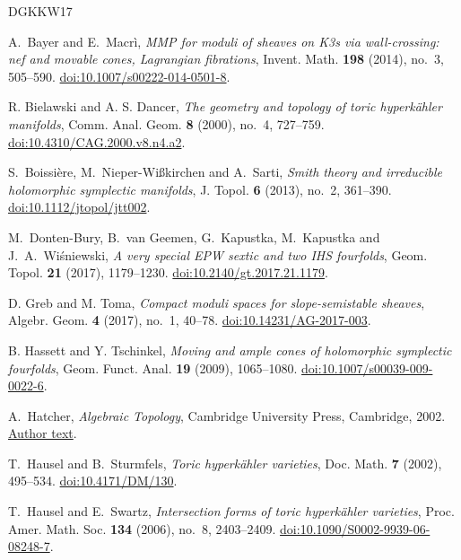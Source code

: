 \begin{thebibliography}{DGKKW17}

A.~Bayer and E.~Macr\`i,
\emph{MMP for moduli of sheaves on K3s via wall-crossing: nef and
movable cones, Lagrangian fibrations},
Invent. Math. \textbf{198} (2014), no.~3, 505--590.
\href{https://doi.org/10.1007/s00222-014-0501-8}{doi:10.1007/s00222-014-0501-8}.

R. Bielawski and A. S. Dancer,
\emph{The geometry and topology of toric hyperk\"ahler manifolds},
Comm. Anal. Geom. \textbf{8} (2000), no.~4, 727--759.
\href{https://doi.org/10.4310/CAG.2000.v8.n4.a2}{doi:10.4310/CAG.2000.v8.n4.a2}.

S.~Boissi\`ere, M.~Nieper-Wi\ss kirchen and A.~Sarti,
\emph{Smith theory and irreducible holomorphic symplectic manifolds},
J. Topol. \textbf{6} (2013), no.~2, 361--390.
\href{https://doi.org/10.1112/jtopol/jtt002}{doi:10.1112/jtopol/jtt002}.

M.~Donten-Bury, B.~van Geemen, G.~Kapustka, M.~Kapustka and J.~A.~Wi\'sniewski,
\emph{A very special EPW sextic and two IHS fourfolds},
Geom. Topol. \textbf{21} (2017), 1179--1230.
\href{https://doi.org/10.2140/gt.2017.21.1179}{doi:10.2140/gt.2017.21.1179}.

D. Greb and M. Toma,
\emph{Compact moduli spaces for slope-semistable sheaves},
Algebr. Geom. \textbf{4} (2017), no.~1, 40--78.
\href{https://doi.org/10.14231/AG-2017-003}{doi:10.14231/AG-2017-003}.

B. Hassett and Y. Tschinkel,
\emph{Moving and ample cones of holomorphic symplectic fourfolds},
Geom. Funct. Anal. \textbf{19} (2009), 1065--1080.
\href{https://doi.org/10.1007/s00039-009-0022-6}{doi:10.1007/s00039-009-0022-6}.

A.~Hatcher,
\emph{Algebraic Topology}, Cambridge University Press,
Cambridge, 2002.
\href{https://pi.math.cornell.edu/~hatcher/AT/ATpage.html}{Author text}.

T.~Hausel and B.~Sturmfels,
\emph{Toric hyperk\"ahler varieties},
Doc. Math. \textbf{7} (2002), 495--534.
\href{https://doi.org/10.4171/DM/130}{doi:10.4171/DM/130}.

T.~Hausel and E.~Swartz,
\emph{Intersection forms of toric hyperk\"ahler varieties},
Proc. Amer. Math. Soc. \textbf{134} (2006), no.~8, 2403--2409.
\href{https://doi.org/10.1090/S0002-9939-06-08248-7}{doi:10.1090/S0002-9939-06-08248-7}.


\end{thebibliography}
